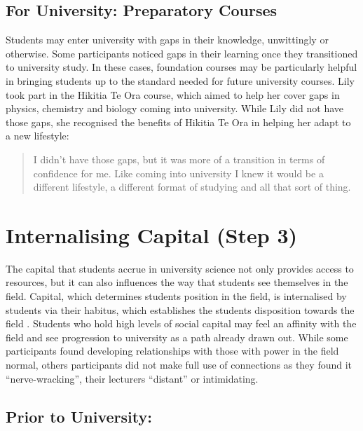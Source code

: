 \subsection{For University: Preparatory Courses}
Students may enter university with gaps in their knowledge, unwittingly or otherwise. Some participants noticed gaps in their learning once they transitioned to university study. In these cases, foundation courses may be particularly helpful in bringing students up to the standard needed for future university courses. Lily took part in the Hikitia Te Ora course, which aimed to help her cover gaps in physics, chemistry and biology coming into university. While Lily did not have those gaps, she recognised the benefits of Hikitia Te Ora in helping her adapt to a new lifestyle: \blockquote{I didn't have those gaps, but it was more of a transition in terms of confidence for me. Like coming into university I knew it would be a different lifestyle, a different format of studying and all that sort of thing.}


\section{Internalising Capital (Step 3)}
The capital that students accrue in university science not only provides access to resources, but it can also influences the way that students see themselves in the field. Capital, which determines students position in the field, is internalised by students via their habitus, which establishes the students disposition towards the field \cite{Bourdieu1992}. Students who hold high levels of social capital may feel an affinity with the field and see progression to university as a path already drawn out. While some participants found developing relationships with those with power in the field normal, others participants did not make full use of connections as they found it ``nerve-wracking'', their lecturers ``distant'' or intimidating. 

\subsection{Prior to University:}

